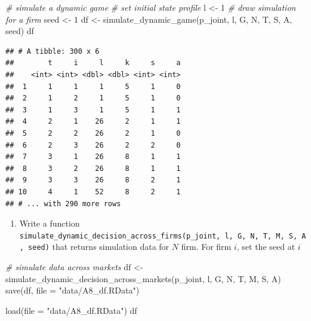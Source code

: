 \documentclass[
]{book}
\newenvironment{Shaded}{\begin{snugshade}}{\end{snugshade}}
\newcommand{\AttributeTok}[1]{\textcolor[rgb]{0.77,0.63,0.00}{#1}}
\newcommand{\CommentTok}[1]{\textcolor[rgb]{0.56,0.35,0.01}{\textit{#1}}}
\newcommand{\DecValTok}[1]{\textcolor[rgb]{0.00,0.00,0.81}{#1}}
\newcommand{\FunctionTok}[1]{\textcolor[rgb]{0.00,0.00,0.00}{#1}}
\newcommand{\NormalTok}[1]{#1}
\newcommand{\OtherTok}[1]{\textcolor[rgb]{0.56,0.35,0.01}{#1}}
\newcommand{\StringTok}[1]{\textcolor[rgb]{0.31,0.60,0.02}{#1}}
\providecommand{\tightlist}{%
  \setlength{\itemsep}{0pt}\setlength{\parskip}{0pt}}
\begin{document}
\begin{Shaded}
\begin{Highlighting}[]
\CommentTok{\# simulate a dynamic game}
\CommentTok{\# set initial state profile}
\NormalTok{l }\OtherTok{\textless{}{-}} \DecValTok{1}
\CommentTok{\# draw simulation for a firm}
\NormalTok{seed }\OtherTok{\textless{}{-}} \DecValTok{1}
\NormalTok{df }\OtherTok{\textless{}{-}} \FunctionTok{simulate\_dynamic\_game}\NormalTok{(p\_joint, l, G, N, T, S, A, seed)}
\NormalTok{df}
\end{Highlighting}
\end{Shaded}

\begin{verbatim}
## # A tibble: 300 x 6
##        t     i     l     k     s     a
##    <int> <int> <dbl> <dbl> <int> <int>
##  1     1     1     1     5     1     0
##  2     1     2     1     5     1     0
##  3     1     3     1     5     1     1
##  4     2     1    26     2     1     1
##  5     2     2    26     2     1     0
##  6     2     3    26     2     2     0
##  7     3     1    26     8     1     1
##  8     3     2    26     8     1     1
##  9     3     3    26     8     2     1
## 10     4     1    52     8     2     1
## # ... with 290 more rows
\end{verbatim}

\begin{enumerate}
\def\labelenumi{\arabic{enumi}.}
\setcounter{enumi}{12}
\tightlist
\item
  Write a function \texttt{simulate\_dynamic\_decision\_across\_firms(p\_joint,\ l,\ G,\ N,\ T,\ M,\ S,\ A,\ seed)} that returns simulation data for \(N\) firm. For firm \(i\), set the seed at \(i\)
\end{enumerate}

\begin{Shaded}
\begin{Highlighting}[]
\CommentTok{\# simulate data across markets}
\NormalTok{df }\OtherTok{\textless{}{-}} \FunctionTok{simulate\_dynamic\_decision\_across\_markets}\NormalTok{(p\_joint, l, G, N, T, M, S, A)}
\FunctionTok{save}\NormalTok{(df, }\AttributeTok{file =} \StringTok{"data/A8\_df.RData"}\NormalTok{)}
\end{Highlighting}
\end{Shaded}

\begin{Shaded}
\begin{Highlighting}[]
\FunctionTok{load}\NormalTok{(}\AttributeTok{file =} \StringTok{"data/A8\_df.RData"}\NormalTok{)}
\NormalTok{df}
\end{Highlighting}
\end{Shaded}
\end{document}
